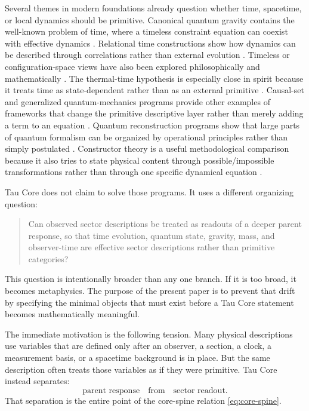 \documentclass[11pt]{article}
\begin{document}
Several themes in modern foundations already question whether time, spacetime,
or local dynamics should be primitive.  Canonical quantum gravity contains the
well-known problem of time, where a timeless constraint equation can coexist
with effective dynamics \cite{WheelerDeWitt1967,Rovelli2004}.  Relational
time constructions show how dynamics can be described through correlations
rather than external evolution \cite{PageWootters1983}.  Timeless or
configuration-space views have also been explored philosophically and
mathematically \cite{Barbour1999}.  The thermal-time hypothesis is especially
close in spirit because it treats time as state-dependent rather than as an
external primitive \cite{ConnesRovelli1994}.  Causal-set and generalized
quantum-mechanics programs provide other examples of frameworks that change
the primitive descriptive layer rather than merely adding a term to an
equation \cite{Bombelli1987,Hartle1991}.  Quantum reconstruction programs show
that large parts of quantum formalism can be organized by operational
principles rather than simply postulated
\cite{Hardy2001,Chiribella2011,MasanesMueller2011}.  Constructor theory is a
useful methodological comparison because it also tries to state physical
content through possible/impossible transformations rather than through one
specific dynamical equation \cite{Deutsch2013,DeutschMarletto2015}.

Tau Core does not claim to solve those programs.  It uses a different
organizing question:
\begin{quote}
Can observed sector descriptions be treated as readouts of a deeper parent response, so
that time evolution, quantum state, gravity, mass, and observer-time are
effective sector descriptions rather than primitive categories?
\end{quote}
This question is intentionally broader than any one branch.  If it is too
broad, it becomes metaphysics.  The purpose of the present paper is to prevent
that drift by specifying the minimal objects that must exist before a Tau Core
statement becomes mathematically meaningful.

The immediate motivation is the following tension.  Many physical descriptions
use variables that are defined only after an observer, a section, a clock, a
measurement basis, or a spacetime background is in place.  But the same
description often treats those variables as if they were primitive.  Tau Core
instead separates:
\[
  \text{parent response}
  \quad \text{from} \quad
  \text{sector readout}.
\]
That separation is the entire point of the core-spine relation
\eqref{eq:core-spine}.
\end{document}
